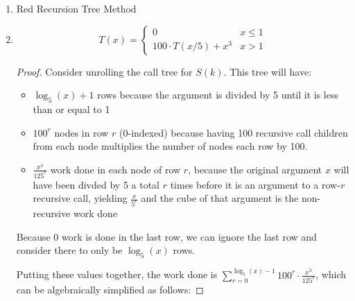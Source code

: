 \documentclass[10pt]{article}
\begin{document}
\begin{enumerate}[label={}]
      \item Red Recursion Tree Method
      \item $$
                  T(x)= \begin{cases}0 & x \leq 1 \\ 100 \cdot T(x / 5)+x^3 & x>1\end{cases}
            $$

            \begin{proof}
                  Consider unrolling the call tree for $S(k)$. This tree will have:
                  \begin{itemize}
                        \item $\log _5(x)+1$ rows because the argument is divided by 5 until it is less than or equal to 1
                        \item $100^r$ nodes in row $r$ (0-indexed) because having 100 recursive call children from each node multiplies the number of nodes each row by 100.
                        \item $\frac{x^3}{125^r}$ work done in each node of row $r$, because the original argument $x$ will have been divded by 5 a total $r$ times before it is an argument to a row-$r$ recursive call, yielding $\frac{x}{5^r}$ and the cube of that argument is the non-recursive work done
                  \end{itemize}
                  Because 0 work is done in the last row, we can ignore the last row and consider there to only be $\log _5(x)$ rows.

                  Putting these values together, the work done is $\sum_{r=0}^{\log _5(x)-1} 100^r \cdot \frac{x^3}{125^r}$, which can be algebraically simplified as follows:


\end{proof}
\end{enumerate}
\end{document}
